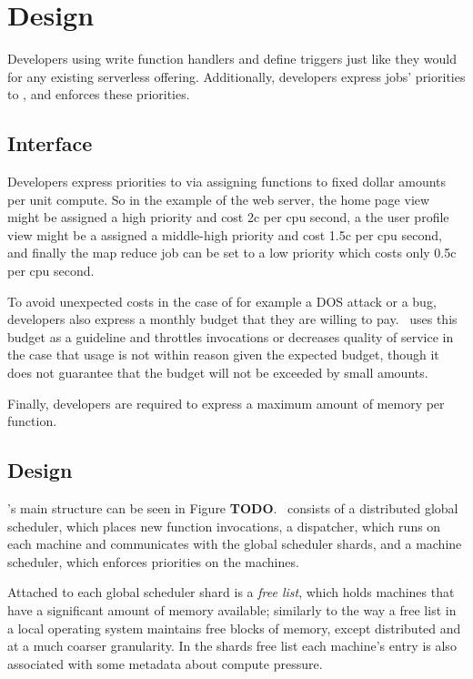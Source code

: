 \section{Design}


Developers using \sys{} write function handlers and define triggers just like
they would for any existing serverless offering. Additionally, developers
express jobs' priorities to \sys{}, and \sys{} enforces these priorities.



\subsection{Interface}

Developers express priorities to \sys{} via assigning functions to fixed dollar
amounts per unit compute. So in the example of the web server, the home page
view might be assigned a high priority and cost 2c per cpu second, a the user
profile view might be a assigned a middle-high priority and cost 1.5c per cpu
second, and finally the map reduce job can be set to a low priority which costs
only 0.5c per cpu second.
 
To avoid unexpected costs in the case of for example a DOS attack or a bug,
developers also express a monthly budget that they are willing to pay.\ \sys{}
uses this budget as a guideline and throttles invocations or decreases quality
of service in the case that usage is not within reason given the expected
budget, though it does not guarantee that the budget will not be exceeded by
small amounts.

Finally, developers are required to express a maximum amount of memory per
function.



\subsection{\sys{} Design}

\sys{}'s main structure can be seen in Figure \textbf{TODO}.\ \sys{} consists of
a distributed global scheduler, which places new function invocations, a
dispatcher, which runs on each machine and communicates with the global
scheduler shards, and a machine scheduler, which enforces priorities on the
machines. 

Attached to each global scheduler shard is a \textit{free list}, which holds
machines that have a significant amount of memory available; similarly to the
way a free list in a local operating system maintains free blocks of memory,
except distributed and at a much coarser granularity. In the shards free list
each machine's entry is also associated with some metadata about compute
pressure.


